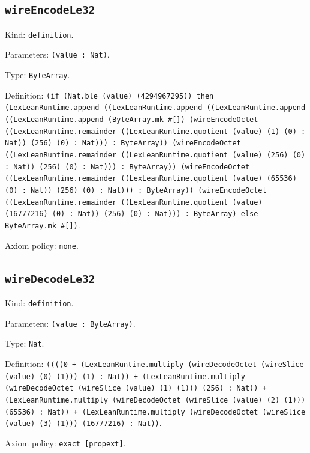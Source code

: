 \documentclass[11pt]{article}
\begin{document}
\subsection*{\texttt{wireEncodeLe32}}
\noindent Kind: \texttt{definition}.\par
\noindent Parameters: \texttt{(value : Nat)}.\par
\noindent Type: \texttt{ByteArray}.\par
\noindent Definition: \texttt{(if (Nat.ble (value) (4294967295)) then (LexLeanRuntime.append ((LexLeanRuntime.append ((LexLeanRuntime.append ((LexLeanRuntime.append (ByteArray.mk \#[]) (wireEncodeOctet ((LexLeanRuntime.remainder ((LexLeanRuntime.quotient (value) (1) (0) : Nat)) (256) (0) : Nat))) : ByteArray)) (wireEncodeOctet ((LexLeanRuntime.remainder ((LexLeanRuntime.quotient (value) (256) (0) : Nat)) (256) (0) : Nat))) : ByteArray)) (wireEncodeOctet ((LexLeanRuntime.remainder ((LexLeanRuntime.quotient (value) (65536) (0) : Nat)) (256) (0) : Nat))) : ByteArray)) (wireEncodeOctet ((LexLeanRuntime.remainder ((LexLeanRuntime.quotient (value) (16777216) (0) : Nat)) (256) (0) : Nat))) : ByteArray) else ByteArray.mk \#[])}.\par
\noindent Axiom policy: \texttt{none}.\par
\subsection*{\texttt{wireDecodeLe32}}
\noindent Kind: \texttt{definition}.\par
\noindent Parameters: \texttt{(value : ByteArray)}.\par
\noindent Type: \texttt{Nat}.\par
\noindent Definition: \texttt{((((0 + (LexLeanRuntime.multiply (wireDecodeOctet (wireSlice (value) (0) (1))) (1) : Nat)) + (LexLeanRuntime.multiply (wireDecodeOctet (wireSlice (value) (1) (1))) (256) : Nat)) + (LexLeanRuntime.multiply (wireDecodeOctet (wireSlice (value) (2) (1))) (65536) : Nat)) + (LexLeanRuntime.multiply (wireDecodeOctet (wireSlice (value) (3) (1))) (16777216) : Nat))}.\par
\noindent Axiom policy: \texttt{exact [propext]}.\par
\end{document}
